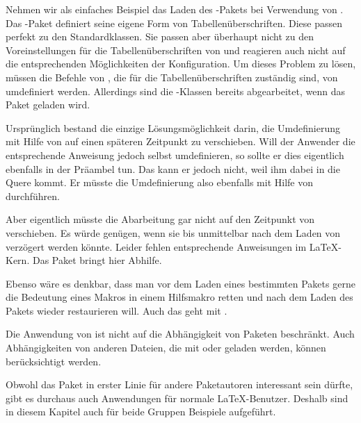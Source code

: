 Nehmen wir als einfaches Beispiel das Laden des
-Pakets bei Verwendung von \KOMAScript{}. Das
-Paket definiert seine eigene Form von
Tabellenüberschriften. Diese passen perfekt zu den Standardklassen. Sie passen
aber überhaupt nicht zu den Voreinstellungen für die Tabellenüberschriften von
\KOMAScript{} und reagieren auch nicht auf die entsprechenden Möglichkeiten
der Konfiguration. Um dieses Problem zu lösen, müssen die Befehle von
, die für die Tabellenüberschriften zuständig sind, von
\KOMAScript{} umdefiniert werden. Allerdings sind die \KOMAScript{}-Klassen
bereits abgearbeitet, wenn das Paket geladen wird.

Ursprünglich bestand die einzige %
\iffalse%
Möglichkeit, dieses Problem zu lösen %
\else%
Lösungsmöglichkeit %
\fi%
darin, die Umdefinierung mit Hilfe von  auf einen
späteren Zeitpunkt zu verschieben. Will der Anwender die entsprechende
Anweisung jedoch selbst umdefinieren, so sollte er dies eigentlich ebenfalls
in der Präambel tun. Das kann er jedoch nicht, weil \KOMAScript{} ihm dabei in
die Quere kommt. Er müsste die Umdefinierung also ebenfalls mit Hilfe von
 durchführen.

Aber eigentlich müsste \KOMAScript{} die Abarbeitung gar
nicht auf den Zeitpunkt von  verschieben. Es
würde genügen, wenn sie bis unmittelbar nach dem Laden von 
verzögert werden könnte. Leider fehlen entsprechende Anweisungen im
\LaTeX-Kern. Das Paket  bringt hier Abhilfe.

Ebenso wäre es denkbar, dass man vor dem Laden
eines bestimmten Pakets gerne die Bedeutung eines Makros in einem Hilfsmakro
retten und nach dem Laden des Pakets wieder restaurieren will. Auch das geht
mit .

Die Anwendung von  ist nicht auf die Abhängigkeit von
Paketen beschränkt. Auch Abhängigkeiten von anderen Dateien, die mit
 oder  geladen werden, können
berücksichtigt werden.%

Obwohl das Paket in erster Linie für andere Paketautoren interessant sein
dürfte, gibt es durchaus auch Anwendungen für normale \LaTeX-Benutzer. Deshalb
sind in diesem Kapitel auch für beide Gruppen Beispiele aufgeführt.

